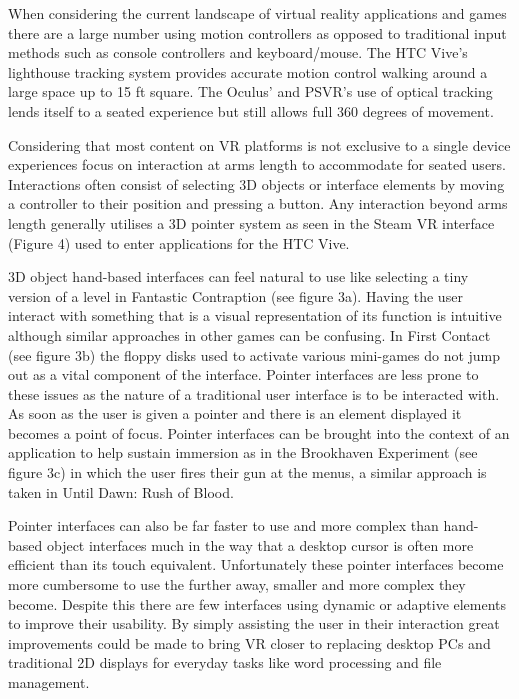 \documentclass[12pt]{article}
\begin{document}
When considering the current landscape of virtual reality applications and games there are a large number using motion controllers as opposed to traditional input methods such as console controllers and keyboard/mouse. The HTC Vive's lighthouse tracking system provides accurate motion control walking around a large space up to 15 ft square. The Oculus' and PSVR's use of optical tracking lends itself to a seated experience but still allows full 360 degrees of movement. 

Considering that most content on VR platforms is not exclusive to a single device experiences focus on interaction at arms length to accommodate for seated users. Interactions often consist of selecting 3D objects or interface elements by moving a controller to their position and pressing a button. Any interaction beyond arms length generally utilises a 3D pointer system as seen in the Steam VR interface (Figure 4) used to enter applications for the HTC Vive.

3D object hand-based interfaces can feel natural to use like selecting a tiny version of a level in Fantastic Contraption (see figure 3a). Having the user interact with something that is a visual representation of its function is intuitive although similar approaches in other games can be confusing. In First Contact (see figure 3b) the floppy disks used to activate various mini-games do not jump out as a vital component of the interface. Pointer interfaces are less prone to these issues as the nature of a traditional user interface is to be interacted with. As soon as the user is given a pointer and there is an element displayed it becomes a point of focus. Pointer interfaces can be brought into the context of an application to help sustain immersion as in the Brookhaven Experiment (see figure 3c) in which the user fires their gun at the menus, a similar approach is taken in Until Dawn: Rush of Blood. 

Pointer interfaces can also be far faster to use and more complex than hand-based object interfaces much in the way that a desktop cursor is often more efficient than its touch equivalent. Unfortunately these pointer interfaces become more cumbersome to use the further away, smaller and more complex they become. Despite this there are few interfaces using dynamic or adaptive elements to improve their usability. By simply assisting the user in their interaction great improvements could be made to bring VR closer to replacing desktop PCs and traditional 2D displays for everyday tasks like word processing and file management.
\end{document}

